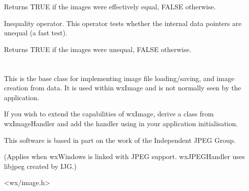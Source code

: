 


Returns TRUE if the images were effectively equal, FALSE otherwise.



Inequality operator. This operator tests whether the internal data pointers are
unequal (a fast test).




Returns TRUE if the images were unequal, FALSE otherwise.

\section{}\label{wximagehandler}

This is the base class for implementing image file loading/saving, and image creation from data.
It is used within wxImage and is not normally seen by the application.

If you wish to extend the capabilities of wxImage, derive a class from wxImageHandler
and add the handler using  in your
application initialisation.


This software is based in part on the work of the Independent JPEG Group.

(Applies when wxWindows is linked with JPEG support. wxJPEGHandler uses libjpeg
created by IJG.)




<wx/image.h>




\label{wximagehandlerconstr}


